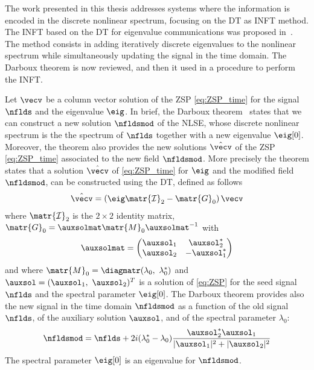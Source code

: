 The work presented in this thesis addresses systems where the information is encoded in the discrete nonlinear spectrum, focusing on the DT as INFT method.
The \ac{INFT}
based on the \ac{DT} for eigenvalue communications was proposed
in~\cite{Yousefi2014a}. The method consists in adding iteratively discrete
eigenvalues to the nonlinear spectrum while simultaneously updating the signal
in the time domain. The Darboux theorem is now reviewed, and then it used in a procedure to perform the \ac{INFT}.





Let $\vecv$ be a column vector solution of the \ac{ZSP} \eqref{eq:ZSP_time} for the
signal $\nflds$ and the eigenvalue $\eig$.
In brief, the Darboux theorem~\cite{matveev1991darboux} states that we can construct a new
solution $\nfldsmod$ of the \ac{NLSE}, whose discrete nonlinear spectrum is the
the  spectrum of $\nflds$ together with a new eigenvalue $\eig[0]$.
Moreover, the theorem also provides the new solutions $\hat{\vecv}$ of the \ac{ZSP}
\eqref{eq:ZSP_time} associated to the new field $\nfldsmod$.
More precisely the theorem states that a solution $\hat{\vecv}$ of
\eqref{eq:ZSP_time} for $\eig$ and the modified field $\nfldsmod$, can be constructed
using the \ac{DT}, defined as follows
\begin{align}\label{eq:darboux_eigenvectors_update}
  \hat{\vecv}=\left(\eig \mathcal{\matr{I}}_2-\matr{G}_0\right)\vecv
\end{align}
where $\mathcal{\matr{I}}_2$ is the $2\times2$ identity matrix,
$\matr{G}_0=\auxsolmat \matr{M}_0\auxsolmat^{-1}$ with
\begin{align}\label{eq:auxsol_matrix}
 \auxsolmat= \begin{pmatrix}
       \auxsol_1 & \auxsol_2^* \\
       \auxsol_2 & -\auxsol_1^*
     \end{pmatrix}
\end{align}
and where  $\matr{M}_0=\diagmatr(\lambda_0,~\lambda_0^*)$ and $
\auxsol=(\auxsol_1,~\auxsol_2)^T$ is a solution of \eqref{eq:ZSP} for the seed
signal $\nflds$ and the spectral parameter $\eig[0]$.
The Darboux theorem provides also the new signal in the time domain
\mbox{$\nfldsmod$} as a function of the old signal $\nflds$, of the  auxiliary solution $\auxsol$,
and of the spectral parameter $\lambda_0$:
\begin{equation}\label{eq:darboux_signal_update}
  \nfldsmod=\nflds+2i(\lambda_0^*-\lambda_0)
  \frac{\auxsol_2^*\auxsol_1}{|\auxsol_1|^2 + |\auxsol_2|^2}
\end{equation}
The spectral parameter $\eig[0]$ is an eigenvalue for $\nfldsmod$.

